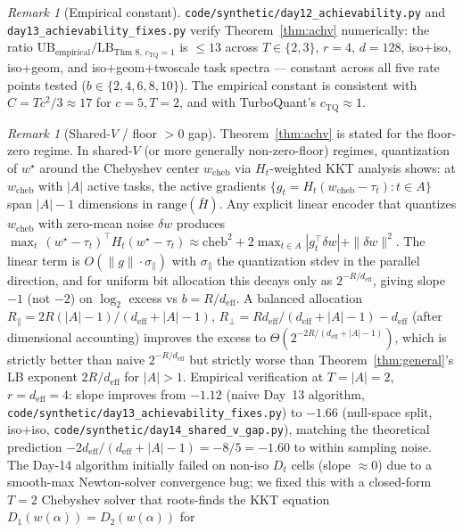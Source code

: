 \documentclass{article}
\theoremstyle{remark}
\newtheorem{remark}[theorem]{Remark}
\newcommand{\range}{\mathrm{range}}
\newcommand{\deff}{d_{\mathrm{eff}}}
\newcommand{\Hbar}{\bar H}
\begin{document}
\begin{remark}[Empirical constant]
\texttt{code/synthetic/day12\_achievability.py} and
\texttt{day13\_achievability\_fixes.py} verify Theorem~\ref{thm:achv}
numerically: the ratio $\mathrm{UB}_{\text{empirical}} /
\mathrm{LB}_{\text{Thm 8, }c_{\mathrm{TQ}}=1}$ is
$\leq 13$ across $T\in\{2,3\}$, $r=4$, $d=128$, iso+iso, iso+geom,
and iso+geom+twoscale task spectra --- constant across all five rate
points tested ($b\in\{2,4,6,8,10\}$). The empirical constant is
consistent with $C = Tc^2/3 \approx 17$ for $c=5, T=2$, and with
TurboQuant's $c_{\mathrm{TQ}}\approx 1$.
\end{remark}

\begin{remark}[Shared-$V$ / floor $>0$ gap]\label{rem:sharedv-gap}
Theorem~\ref{thm:achv} is stated for the floor-zero regime. In
shared-$V$ (or more generally non-zero-floor) regimes, quantization
of $w^\star$ around the Chebyshev center $w_{\text{cheb}}$ via
$H_t$-weighted KKT analysis shows: at $w_{\text{cheb}}$ with $|A|$
active tasks, the active gradients $\{g_t = H_t(w_{\text{cheb}}-\tau_t)
: t\in A\}$ span $|A|-1$ dimensions in $\range(\Hbar)$. Any explicit
linear encoder that quantizes $w_{\text{cheb}}$ with zero-mean noise
$\delta w$ produces
$\max_t\,(w^\star-\tau_t)^\top H_t(w^\star-\tau_t) \approx
\text{cheb}^2 + 2\max_{t\in A}|g_t^\top \delta w| + \|\delta w\|^2$.
The linear term is $O(\|g\|\cdot\sigma_\parallel)$ with
$\sigma_\parallel$ the quantization stdev in the parallel direction,
and for uniform bit allocation this decays only as $2^{-R/\deff}$,
giving slope $-1$ (not $-2$) on $\log_2$ excess vs $b = R/\deff$.
A balanced allocation $R_\parallel = 2R(|A|-1)/(\deff+|A|-1)$,
$R_\perp = R\deff/(\deff+|A|-1) - \deff$ (after dimensional
accounting) improves the excess to $\Theta(2^{-2R/(\deff+|A|-1)})$,
which is strictly better than naive $2^{-R/\deff}$ but strictly
worse than Theorem~\ref{thm:general}'s LB exponent $2R/\deff$ for
$|A|>1$.
Empirical verification at $T=|A|=2$, $r=\deff=4$: slope improves
from $-1.12$ (naive Day~13 algorithm,
\texttt{code/synthetic/day13\_achievability\_fixes.py}) to $-1.66$
(null-space split, iso+iso,
\texttt{code/synthetic/day14\_shared\_v\_gap.py}), matching the
theoretical prediction $-2\deff/(\deff+|A|-1) = -8/5 = -1.60$ to
within sampling noise. The Day-14 algorithm initially failed on
non-iso $D_t$ cells (slope $\approx 0$) due to a smooth-max
Newton-solver convergence bug; we fixed this with a closed-form
$T=2$ Chebyshev solver that roots-finds the KKT equation
$D_1(w(\alpha)) = D_2(w(\alpha))$ for

\end{remark}
\end{document}
